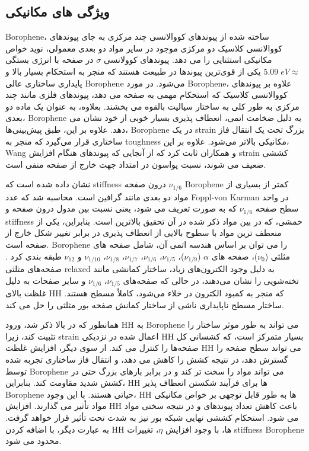 \subsection{ویژگی های مکانیکی}
\gls{Borophene}، ساخته شده از پیوندهای کووالانسی چند مرکزی به جای پیوندهای کووالانسی کلاسیک دو مرکزی موجود در سایر مواد دو بعدی معمولی، نوید خواص مکانیکی استثنایی را می دهد. پیوندهای کوولانسی $\sigma$ در صفحه با انرژی بستگی $5.09\; eV \approx$  یکی از قوی‌ترین پیوندها در طبیعت هستند که منجر به استحکام بسیار بالا و پایداری ساختاری عالی \gls{Borophene} می‌شود. در مورد \gls{Borophene}، علاوه بر پیوندهای کووالانسی کلاسیک که استحکام مهمی به صفحه می دهد، پیوندهای فلزی مانند چند مرکزی به طور کلی به ساختار سیالیت بالقوه می بخشند.\cite{zhangTwoDimensionalBoronMonolayers2015} بعلاوه، به عنوان یک ماده دو بعدی، \gls{Borophene} به دلیل ضخامت اتمی، انعطاف پذیری بسیار خوبی از خود نشان می دهد. علاوه بر این، طبق پیش‌بینی‌ها، \gls{Borophene} در یک \gls{strain} بزرگ تحت یک انتقال فاز ساختاری قرار می‌گیرد که منجر به \gls{toughness} مکانیکی بالاتر می‌شود. علاوه بر این، \gls{Wang} و همکاران\cite{wangStrainEffectsBorophene2016} ثابت کرد که از آنجایی که پیوندهای  هنگام افزایش \gls{strain} کششی ضعیف می شوند، نسبت پواسون در امتداد جهت خارج از صفحه منفی است\cite{liuRecentProgressGrapheneanalogous2019}.

نشان داده شده است که \gls{stiffness} درون صفحه $\nu_{1/6}$ \gls{Borophene} کمتر از بسیاری از مواد دو بعدی مانند گرافین است\cite{zhangElasticityFlexibilityIdeal2017}. محاسبه شد که عدد \gls{Foppl-von Karman} در واحد سطح صفحه $\nu_{1/6}$ که به صورت  تعریف می شود، یعنی نسبت بین مدول درون صفحه و \gls{stiffness} خمشی، که در بین مواد ذکر شده در آن تحقیق بالاترین است. بنابراین، یکی از منعطف ترین مواد با سطوح بالایی از انعطاف پذیری در برابر تغییر شکل خارج از صفحه است. \gls{Borophene} را می توان بر اساس هندسه اتمی آن، شامل صفحه های مثلثی ($\nu_0$)، صفحه های $\alpha$ ($\nu_{1/9}$)، $\nu_{1/5}$، $\nu_{1/6}$، $\nu_{1/7}$، $\nu_{1/8}$، $\nu_{1/10}$ و $\nu_{12}$ طبقه بندی کرد \cite{zhaoPhononmediatedSuperconductivityBorophenes2016}. صفحه‌های مثلثی \gls{relaxed} به دلیل وجود الکترون‌های زیاد، ساختار کمانشی مانند تخته‌شویی را نشان می‌دهند، در حالی که صفحه‌های $\nu_{1/5}$، $\nu_{1/6}$ و سایر صفحات به دلیل غلظت بالای \glsdesc{HH} که منجر به کمبود الکترون در خلاء می‌شود، کاملاً مسطح هستند. ساختار مسطح ناپایداری ناشی از ساختار کمانش صفحه بور مثلثی را حل می کند. 

همانطور که در بالا ذکر شد، ورود \glsdesc{HH} به \gls{Borophene} می تواند به طور موثر ساختار را تثبیت کند، زیرا \gls{strain} اعمال شده در نزدیکی \glsdesc{HH} بسیار متمرکز است، که کشسانی کل صفحه‌ها را کنترل می کند. از سوی دیگر، افزایش غلظت \glsdesc{HH} می تواند سطح صفحه را گسترش دهد، در نتیجه کشش را کاهش می دهد، و انتقال فاز ساختاری تجربه شده توسط \gls{Borophene} می تواند مواد را سخت تر کند و در برابر بارهای بزرگ حتی در کشش شدید مقاومت کند. بنابراین، \glsdesc{HH} ها برای فرآیند شکستن انعطاف پذیر \gls{Borophene} حیاتی هستند. با این وجود، \glsdesc{HH} ها به طور قابل توجهی بر خواص مکانیکی مواد تأثیر می گذارند. افزایش \glsdesc{HH} باعث کاهش تعداد پیوندهای  و در نتیجه سختی مواد می شود. استحکام کششی نهایی شبکه بور نیز به شدت تحت تأثیر قرار خواهد گرفت. به عبارت دیگر، با اضافه کردن \glsdesc{HH} ها، با وجود افزایش $\eta$، تغییرات \gls{stiffness} \gls{Borophene} محدود می شود. 

